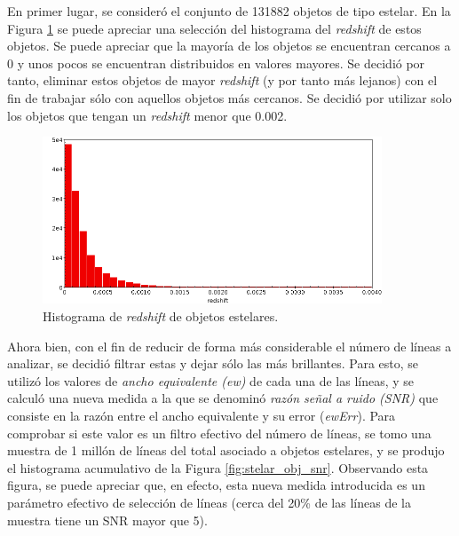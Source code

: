 En primer lugar, se consideró el conjunto de 131882 objetos de tipo estelar. En la Figura \ref{fig:stelar_obj_redshift} se puede apreciar una selección del histograma del \textit{redshift} de estos objetos. Se puede apreciar que la mayoría de los objetos se encuentran cercanos a 0 y unos pocos se encuentran distribuidos en valores mayores. Se decidió por tanto, eliminar estos objetos de mayor \textit{redshift} (y por tanto más lejanos) con el fin de trabajar sólo con aquellos objetos más cercanos. Se decidió por utilizar solo los objetos que tengan un \textit{redshift} menor que 0.002.

\begin{figure}[h!]
\begin{center}
\includegraphics[width=0.9\textwidth]{imagenes/stelar_obj_redshift_hist.png}
\end{center}
\vspace*{-5mm}
\caption{Histograma de \textit{redshift} de objetos estelares.}
\label{fig:stelar_obj_redshift}
\end{figure}

Ahora bien, con el fin de reducir de forma más considerable el número de líneas a analizar, se decidió filtrar estas y dejar sólo las más brillantes. Para esto, se utilizó los valores de \textit{ancho equivalente (ew)} de cada una de las líneas, y se calculó una nueva medida a la que se denominó \textit{razón señal a ruido (SNR)} que consiste en la razón entre el ancho equivalente y su error (\textit{ewErr}). Para comprobar si este valor es un filtro efectivo del número de líneas, se tomo una muestra de 1 millón de líneas del total asociado a objetos estelares, y se produjo el histograma acumulativo de la Figura \ref{fig:stelar_obj_snr}. Observando esta figura, se puede apreciar que, en efecto, esta nueva medida introducida es un parámetro efectivo de selección de líneas (cerca del 20\% de las líneas de la muestra tiene un SNR mayor que 5).

